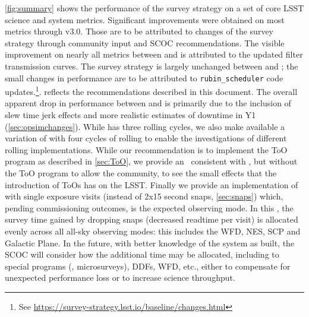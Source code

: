  \autoref{fig:summary} shows the performance of the survey strategy on a set of core LSST science and system metrics. Significant improvements were obtained on most metrics through v3.0. Those are to be attributed to changes of the survey strategy through community input and SCOC recommendations. The visible improvement on nearly all metrics between  and  is attributed to the updated filter transmission curves. The survey strategy is largely unchanged between  and ; the small changes in performance are to be attributed to  \texttt{rubin\_scheduler} code updates.\footnote{See \url{https://survey-strategy.lsst.io/baseline/changes.html}}.  reflects the recommendations described in this document. The overall apparent drop in performance between  and  is primarily due to the inclusion of slew time jerk effects and more realistic estimates of downtime in Y1 (\autoref{sec:opsimchanges}). While  has three rolling cycles, we also make available a variation of  with four cycles of rolling to enable the investigations of different rolling implementations. While our recommendation is to implement the ToO program as described in \autoref{sec:ToO}, we provide an \opsim\ consistent with , but without the ToO program to allow the community, to see the small effects that the introduction of ToOs has on the LSST. Finally we provide an implementation of  with single exposure visits (instead of 2x15 second snaps, \autoref{sec:snaps}) which, pending commissioning outcomes, is the expected observing mode. In this \opsim, the survey time gained by dropping snaps (decreased readtime per visit) is allocated evenly across all all-sky observing modes: this includes the WFD, NES, SCP and Galactic Plane. In the future, with better knowledge of the system as built, the SCOC will consider how the additional time may be allocated, including to special programs (\eg, microsurveys), DDFs, WFD, etc., either to compensate for unexpected performance loss or to increase science throughput.


